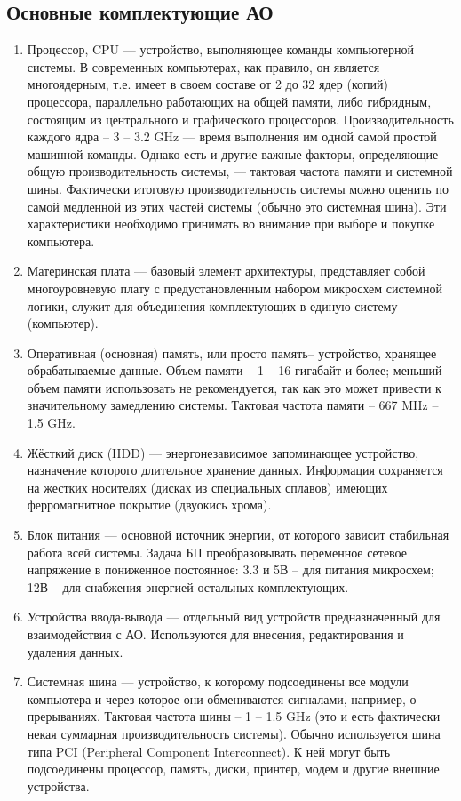 \documentclass[12pt]{article}
\begin{document}
	\subsection*{Основные комплектующие АО}
	\begin{enumerate}[wide, labelwidth=!, labelindent=0pt]
		\item Процессор, CPU ---  устройство, выполняющее команды компьютерной системы. В современных компьютерах, как правило, он является многоядерным, т.е. имеет в своем составе от 2 до 32 ядер (копий) процессора, параллельно работающих на общей памяти, либо гибридным, состоящим из центрального и графического процессоров. Производительность каждого ядра – 3 – 3.2 GHz --- время выполнения им одной самой простой машинной команды. Однако есть и другие важные факторы, определяющие общую производительность системы, --- тактовая частота памяти и системной шины. Фактически итоговую производительность системы можно оценить по самой медленной из этих частей системы (обычно это системная шина). Эти характеристики необходимо принимать во внимание при выборе и покупке компьютера.
		\item Материнская плата --- базовый элемент архитектуры, представляет собой многоуровневую плату с предустановленным набором микросхем системной логики, служит для объединения комплектующих в единую систему (компьютер).
		\item Оперативная (основная) память, или просто память– устройство, хранящее обрабатываемые данные. Объем памяти – 1 – 16 гигабайт и более; меньший объем памяти использовать не рекомендуется, так как это может привести к значительному замедлению системы. Тактовая частота памяти – 667 MHz – 1.5 GHz.
		\item Жёсткий диск (HDD) --- энергонезависимое запоминающее устройство, назначение которого длительное хранение данных. Информация сохраняется на жестких носителях (дисках из специальных сплавов) имеющих ферромагнитное покрытие (двуокись хрома).
		\item Блок питания ---  основной источник энергии, от которого зависит стабильная работа всей системы. Задача БП преобразовывать переменное сетевое напряжение в пониженное постоянное: 3.3 и 5В – для питания микросхем; 12В – для снабжения энергией остальных комплектующих.
		\item Устройства ввода-вывода --- отдельный вид устройств предназначенный для взаимодействия с АО. Используются для внесения, редактирования и удаления данных.
		\item Системная шина --- устройство, к которому подсоединены все модули компьютера и через которое они обмениваются сигналами, например, о прерываниях. Тактовая частота шины – 1 – 1.5 GHz (это и есть фактически некая суммарная производительность системы). Обычно используется шина типа PCI (Peripheral Component Interconnect). К ней могут быть подсоединены процессор, память, диски, принтер, модем и другие внешние устройства.

\end{enumerate}
\end{document}
